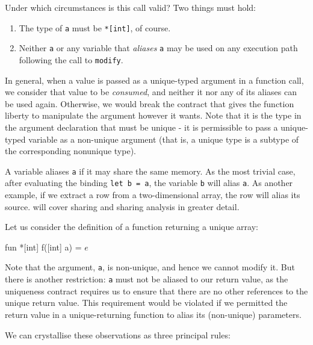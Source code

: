 Under which circumstances is this call valid?  Two things must hold:
\begin{enumerate}
\item The type of \texttt{a} must be \texttt{*[int]}, of course.

\item Neither \texttt{a} or any variable that \textit{aliases}
  \texttt{a} may be used on any execution path following the call to
  \texttt{modify}.
\end{enumerate}

In general, when a value is passed as a unique-typed argument in a
function call, we consider that value to be \textit{consumed}, and
neither it nor any of its aliases can be used again.  Otherwise, we
would break the contract that gives the function liberty to manipulate
the argument however it wants.  Note that it is the type in the
argument declaration that must be unique - it is permissible to pass a
unique-typed variable as a non-unique argument (that is, a unique type
is a subtype of the corresponding nonunique type).

A variable aliases \texttt{a} if it may share the same memory.  As the
most trivial case, after evaluating the binding \texttt{let b = a},
the variable \texttt{b} will alias \texttt{a}.  As another example, if
we extract a row from a two-dimensional array, the row will alias its
source.   will cover sharing and sharing analysis
in greater detail.

Let us consider the definition of a function returning a unique array:

\begin{colorcode}
fun *[int] f([int] a) = \(e\)
\end{colorcode}

Note that the argument, \texttt{a}, is non-unique, and hence we cannot
modify it.  But there is another restriction: \texttt{a} must not be
aliased to our return value, as the uniqueness contract requires us to
ensure that there are no other references to the unique return value.
This requirement would be violated if we permitted the return value in
a unique-returning function to alias its (non-unique) parameters.

We can crystallise these observations as three principal rules:

